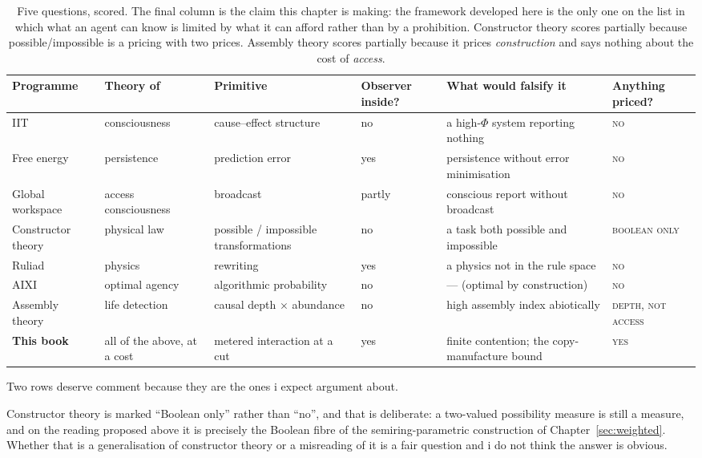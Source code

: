 \begin{table}[htbp]
\centering
\small
\renewcommand{\arraystretch}{1.35}
\begin{tabular}{@{}p{2.1cm} p{2.3cm} p{2.2cm} p{1.5cm} p{2.4cm} p{1.6cm}@{}}
\toprule
\textbf{Programme} & \textbf{Theory of} & \textbf{Primitive} &
\textbf{Observer inside?} & \textbf{What would falsify it} &
\textbf{Anything priced?} \\
\midrule
IIT & consciousness & cause--effect structure & no &
a high-$\Phi$ system reporting nothing & \textsc{no} \\
Free energy & persistence & prediction error & yes &
persistence without error minimisation & \textsc{no} \\
Global workspace & access consciousness & broadcast &
partly & conscious report without broadcast & \textsc{no} \\
Constructor theory & physical law & possible / impossible
transformations & no & a task both possible and impossible &
\textsc{boolean only} \\
Ruliad & physics & rewriting & yes & a physics not in the rule
space & \textsc{no} \\
AIXI & optimal agency & algorithmic probability & no &
--- (optimal by construction) & \textsc{no} \\
Assembly theory & life detection & causal depth $\times$
abundance & no & high assembly index abiotically &
\textsc{depth, not access} \\
\midrule
\textbf{This book} & all of the above, at a cost &
metered interaction at a cut & yes &
finite contention; the copy-manufacture bound &
\textsc{yes} \\
\bottomrule
\end{tabular}
\caption{Five questions, scored. The final column is the claim this
chapter is making: the framework developed here is the only one on
the list in which what an agent can know is limited by what it can
afford rather than by a prohibition. Constructor theory scores
partially because possible/impossible is a pricing with two prices.
Assembly theory scores partially because it prices \emph{construction}
and says nothing about the cost of \emph{access}.}
\label{tab:related}
\end{table}

Two rows deserve comment because they are the ones i expect
argument about.

Constructor theory is marked ``Boolean only'' rather than
``no'', and that is deliberate: a two-valued possibility measure is
still a measure, and on the reading proposed above it is precisely
the Boolean fibre of the semiring-parametric construction of
Chapter~\ref{sec:weighted}.
Whether that is a generalisation of constructor theory or a
misreading of it is a fair question and i do not think the answer
is obvious.

